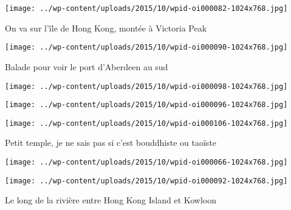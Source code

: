 \begin{center} \texttt{[image: ../wp-content/uploads/2015/10/wpid-oi000082-1024x768.jpg]} \end{center}

 

 On va sur l'île de Hong Kong, montée à Victoria Peak 

 

\begin{center} \texttt{[image: ../wp-content/uploads/2015/10/wpid-oi000090-1024x768.jpg]} \end{center}

 

 Balade pour voir le port d'Aberdeen au sud 

 

\begin{center} \texttt{[image: ../wp-content/uploads/2015/10/wpid-oi000098-1024x768.jpg]} \end{center}

 

 

\begin{center} \texttt{[image: ../wp-content/uploads/2015/10/wpid-oi000096-1024x768.jpg]} \end{center}

 

 

\begin{center} \texttt{[image: ../wp-content/uploads/2015/10/wpid-oi000106-1024x768.jpg]} \end{center}

 

 Petit temple, je ne sais pas si c'est bouddhiste ou taoïste 

 

\begin{center} \texttt{[image: ../wp-content/uploads/2015/10/wpid-oi000066-1024x768.jpg]} \end{center}

 

 

\begin{center} \texttt{[image: ../wp-content/uploads/2015/10/wpid-oi000092-1024x768.jpg]} \end{center}

 

 Le long de la rivière entre Hong Kong Island et Kowloon 


